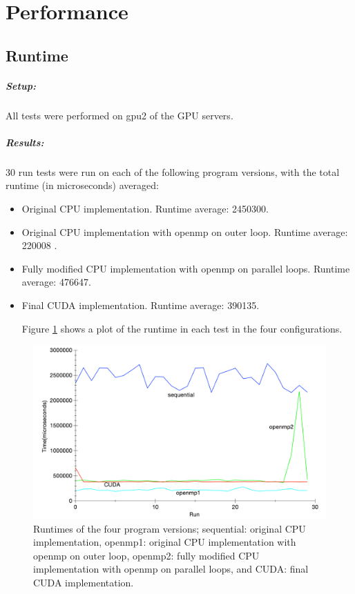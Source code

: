 
\section{Performance}

\subsection{Runtime}
\subparagraph{Setup:} All tests were performed on gpu2 of the GPU servers.

\subparagraph{Results:} 

30 run tests were run on each of the following program versions, with the total runtime (in microseconds) averaged:
\begin{itemize}
\item Original CPU implementation. Runtime average: 2450300.
\item Original CPU implementation with openmp on outer loop. Runtime average: 220008 .
\item Fully modified CPU implementation with openmp on parallel loops. Runtime average: 476647.
\item Final CUDA implementation. Runtime average: 390135.

Figure \ref{fig_res} shows a plot of the runtime in each test in the four configurations.
\end{itemize}
\begin{figure}[H]
\includegraphics[width=150mm]{results_plot} 
\caption{Runtimes of the four program versions; sequential: original CPU implementation, openmp1: original CPU implementation with openmp on outer loop, openmp2: fully modified CPU implementation with openmp on parallel loops, and CUDA: final CUDA implementation.}
\label{fig_res}
\end{figure}


